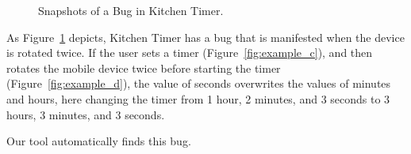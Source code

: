 \begin{figure}[!t]
\centering
{}
\hfil
{}
\caption{Snapshots of a Bug in Kitchen Timer.}
\label{fig:example}
\end{figure}


As Figure~\ref{fig:example} depicts, Kitchen Timer has a bug that is manifested when the device is rotated twice. If the user sets a timer (Figure~\ref{fig:example_c}), and then rotates the mobile device twice before starting the timer (Figure~\ref{fig:example_d}), the value of seconds overwrites the values of minutes and hours, here changing the timer from 1 hour, 2 minutes, and 3 seconds to 3 hours, 3 minutes, and 3 seconds.

Our tool automatically finds this bug. %

